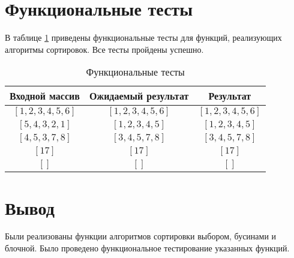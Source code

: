 \section{Функциональные тесты}

В таблице \ref{tbl:func-tests} приведены функциональные тесты для функций, реализующих алгоритмы сортировок. Все тесты пройдены успешно.

\begin{table}[h]
	\begin{center}
		\caption{\label{tbl:func-tests} Функциональные тесты}
		\begin{tabular}{|c|c|c|}
			\hline
			Входной массив & Ожидаемый результат & Результат \\ 
			\hline
			$[1, 2, 3, 4, 5, 6]$ & $[1, 2, 3, 4, 5, 6]$  & $[1, 2, 3, 4, 5, 6]$\\
			$[5, 4, 3, 2, 1]$  & $[1, 2, 3, 4, 5]$ & $[1, 2, 3, 4, 5]$\\
			$[4, 5, 3, 7, 8]$  & $[3, 4, 5, 7, 8]$  & $[3, 4, 5, 7, 8]$\\
			$[17]$  & $[17]$  & $[17]$\\
			$[]$  & $[]$  & $[]$\\
			\hline
		\end{tabular}
	\end{center}
\end{table}

\section*{Вывод}

Были реализованы функции алгоритмов сортировки выбором, бусинами и блочной. Было проведено функциональное тестирование указанных функций.